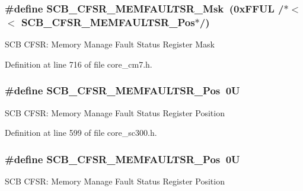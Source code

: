 \subsubsection[{\texorpdfstring{S\+C\+B\+\_\+\+C\+F\+S\+R\+\_\+\+M\+E\+M\+F\+A\+U\+L\+T\+S\+R\+\_\+\+Msk}{SCB_CFSR_MEMFAULTSR_Msk}}]{\setlength{\rightskip}{0pt plus 5cm}\#define S\+C\+B\+\_\+\+C\+F\+S\+R\+\_\+\+M\+E\+M\+F\+A\+U\+L\+T\+S\+R\+\_\+\+Msk~(0x\+F\+F\+U\+L /$\ast$$<$$<$ S\+C\+B\+\_\+\+C\+F\+S\+R\+\_\+\+M\+E\+M\+F\+A\+U\+L\+T\+S\+R\+\_\+\+Pos$\ast$/)}\hypertarget{group___c_m_s_i_s___s_c_b_gad46716159a3808c9e7da22067d6bec98}{}\label{group___c_m_s_i_s___s_c_b_gad46716159a3808c9e7da22067d6bec98}
S\+CB C\+F\+SR\+: Memory Manage Fault Status Register Mask 

Definition at line 716 of file core\+\_\+cm7.\+h.

\subsubsection[{\texorpdfstring{S\+C\+B\+\_\+\+C\+F\+S\+R\+\_\+\+M\+E\+M\+F\+A\+U\+L\+T\+S\+R\+\_\+\+Pos}{SCB_CFSR_MEMFAULTSR_Pos}}]{\setlength{\rightskip}{0pt plus 5cm}\#define S\+C\+B\+\_\+\+C\+F\+S\+R\+\_\+\+M\+E\+M\+F\+A\+U\+L\+T\+S\+R\+\_\+\+Pos~0U}\hypertarget{group___c_m_s_i_s___s_c_b_ga91f41491cec5b5acca3fbc94efbd799e}{}\label{group___c_m_s_i_s___s_c_b_ga91f41491cec5b5acca3fbc94efbd799e}
S\+CB C\+F\+SR\+: Memory Manage Fault Status Register Position 

Definition at line 599 of file core\+\_\+sc300.\+h.

\subsubsection[{\texorpdfstring{S\+C\+B\+\_\+\+C\+F\+S\+R\+\_\+\+M\+E\+M\+F\+A\+U\+L\+T\+S\+R\+\_\+\+Pos}{SCB_CFSR_MEMFAULTSR_Pos}}]{\setlength{\rightskip}{0pt plus 5cm}\#define S\+C\+B\+\_\+\+C\+F\+S\+R\+\_\+\+M\+E\+M\+F\+A\+U\+L\+T\+S\+R\+\_\+\+Pos~0U}\hypertarget{group___c_m_s_i_s___s_c_b_ga91f41491cec5b5acca3fbc94efbd799e}{}\label{group___c_m_s_i_s___s_c_b_ga91f41491cec5b5acca3fbc94efbd799e}
S\+CB C\+F\+SR\+: Memory Manage Fault Status Register Position 

